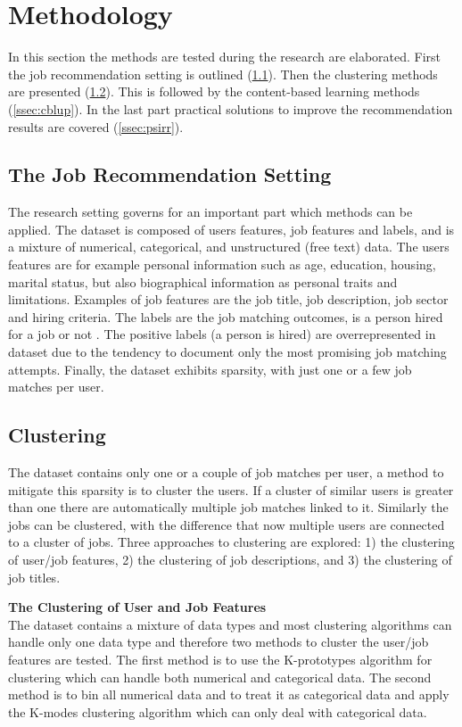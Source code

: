 \section{Methodology}
\label{sec:meth}

In this section the methods are tested during the research are elaborated. First the job recommendation setting is outlined (\ref{ssec:jrs}). Then the clustering methods are presented (\ref{ssec:clus}). This is followed by the content-based learning methods (\ref{ssec:cblup}). In the last part practical solutions to improve the recommendation results are covered (\ref{ssec:psirr}). 

\subsection{The Job Recommendation Setting}
\label{ssec:jrs}
The research setting governs for an important part which methods can be applied.
The dataset is composed of users features, job features and labels, and is a mixture of numerical, categorical, and unstructured (free text) data.
The users features are for example personal information such as age, education, housing, marital status, but also biographical information as personal traits and limitations. 
Examples of job features are the job title, job description, job sector and hiring criteria. 
The labels are the job matching outcomes, is a person hired for a job or not . 
The positive labels (a person is hired) are overrepresented in dataset due to the tendency to document only the most promising job matching attempts. 
Finally, the dataset exhibits sparsity, with just one or a few job matches per user.

\subsection{Clustering}
\label{ssec:clus}
The dataset contains only one or a couple of job matches per user, a method to mitigate this sparsity is to cluster the users. 
If a cluster of similar users is greater than one there are automatically multiple job matches linked to it. 
Similarly the jobs can be clustered, with the difference that now multiple users are connected to a cluster of jobs. 
Three approaches to clustering are explored: 1) the clustering of user/job features, 2) the clustering of job descriptions, and 3) the clustering of job titles. 

\noindent
\textbf{The Clustering of User and Job Features} \\
The dataset contains a mixture of data types and most clustering algorithms can handle only one data type and therefore two methods to cluster the user/job features are tested.
The first method is to use the K-prototypes algorithm \cite{huang1997clustering} for clustering which can handle both numerical and categorical data. 
The second method is to bin all numerical data and to treat it as categorical data and apply the K-modes clustering algorithm \cite{huang1997clustering, huang1998extensions} which can only deal with categorical data. 

